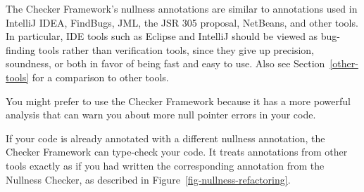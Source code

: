 The Checker Framework's nullness annotations are similar to annotations used
in IntelliJ IDEA, FindBugs, JML, the JSR 305 proposal, NetBeans, and other
tools.  In particular, IDE tools such as Eclipse and IntelliJ should be
viewed as bug-finding tools rather than verification tools, since they
give up precision, soundness, or both in favor of being fast and
easy to use.  Also
see Section~\ref{other-tools} for a comparison to other tools.

You might prefer to use the Checker Framework because it has a more
powerful analysis that can warn you about more null pointer errors in your
code.

If your code is already annotated with a different nullness
annotation, the Checker Framework can type-check your code.
It treats annotations from other tools
exactly as if you had written the corresponding annotation from the
Nullness Checker, as described in Figure~\ref{fig-nullness-refactoring}.


